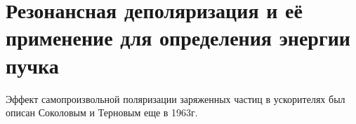\section{Резонансная деполяризация и её применение для определения энергии пучка}
\label{sec:respnant_dep}
Эффект самопроизвольной поляризации заряженных частиц в ускорителях был описан Соколовым и Терновым еще в 1963г. \cite{SokolovTernov63}
 